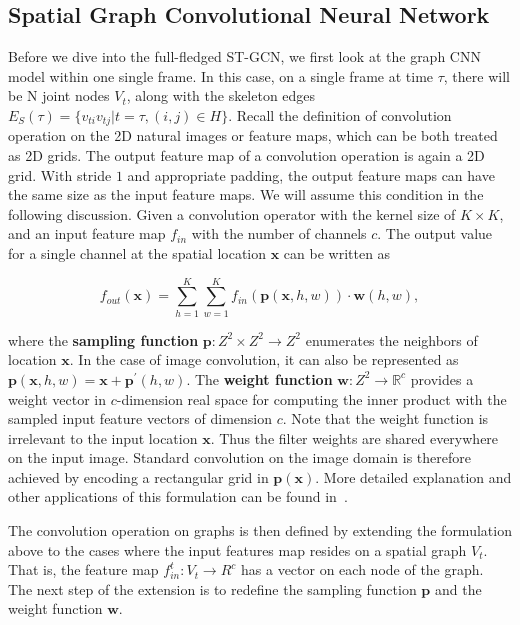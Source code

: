 \documentclass[letterpaper]{article} \usepackage{aaai18}  \usepackage{times}  \usepackage{helvet}  \usepackage{courier}  \usepackage{url}  \usepackage{graphicx}
\begin{document}
\subsection{Spatial Graph Convolutional Neural Network}
Before we dive into the full-fledged ST-GCN, we first look at the graph CNN model within one single frame.
In this case, on a single frame at time $ \tau $, there will be N joint nodes $ V_t $, along with the skeleton edges $ E_S(\tau) = \{v_{ti}v_{tj}| t= \tau, (i, j) \in H\} $.
Recall the definition of convolution operation on the 2D natural images or feature maps, which can be both treated as 2D grids.
The output feature map of a convolution operation is again a 2D grid.
With stride $ 1 $ and appropriate padding, the output feature maps can have the same size as the input feature maps. 
We will assume this condition in the following discussion.
Given a convolution operator with the kernel size of $ K\times K $, and an input feature map $ f_{in} $ with the number of channels $ c $.
The output value for a single channel at the spatial location $ \mathbf{x} $ can be written as 

\begin{equation}\label{eq:gen_conv}
f_{out}(\mathbf{x}) = \sum_{h=1}^{K} \sum_{w=1}^{K} f_{in}(\mathbf{p}(\mathbf{x}, h, w))\cdot \mathbf{w}(h, w), 	
\end{equation}

where the \textbf{sampling function} $ \mathbf{p}: Z^2\times Z^2\rightarrow Z^2 $ enumerates the neighbors of location $ \mathbf{x} $.
In the case of image convolution, it can also be represented as $ \mathbf{p}(\mathbf{x}, h, w) = \mathbf{x} + \mathbf{p^\prime}(h, w). $ 
The \textbf{weight function} $ \mathbf{w}: Z^2\rightarrow \mathbb{R}^c$ provides a weight vector in $ c $-dimension real space for computing the inner product with the sampled input feature vectors of dimension $ c $.
Note that the weight function is irrelevant to the input location $ \mathbf{x} $.
Thus the filter weights are shared everywhere on the input image.
Standard convolution on the image domain is therefore achieved by encoding a rectangular grid in $ \mathbf{p}(\mathbf{x}) $.
More detailed explanation and other applications of this formulation can be found in~\cite{Dai2017Arxiv}.

The convolution operation on graphs is then defined by extending the formulation above to the cases where the input features map resides on a spatial graph $ V_t $.
That is, the feature map $ f_{in}^t : V_t\rightarrow R^c$ has a vector on each node of the graph.
The next step of the extension is to redefine the sampling function $ \mathbf{p} $ and the weight function $ \mathbf{w} $.
\end{document}
